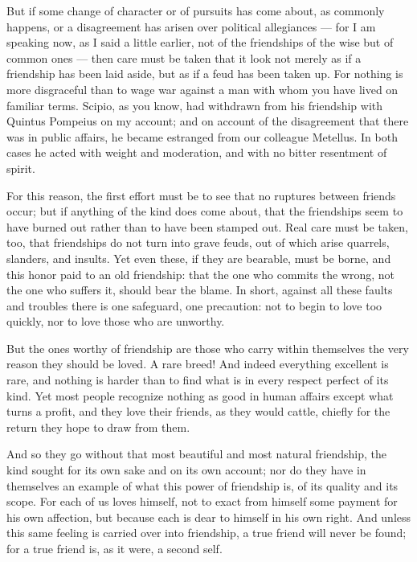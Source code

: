  But if some change of character or of pursuits has come about, as commonly happens, or a disagreement has arisen over political allegiances — for I am speaking now, as I said a little earlier, not of the friendships of the wise but of common ones — then care must be taken that it look not merely as if a friendship has been laid aside, but as if a feud has been taken up. For nothing is more disgraceful than to wage war against a man with whom you have lived on familiar terms. Scipio, as you know, had withdrawn from his friendship with Quintus Pompeius on my account; and on account of the disagreement that there was in public affairs, he became estranged from our colleague Metellus. In both cases he acted with weight and moderation, and with no bitter resentment of spirit.

 For this reason, the first effort must be to see that no ruptures between friends occur; but if anything of the kind does come about, that the friendships seem to have burned out rather than to have been stamped out. Real care must be taken, too, that friendships do not turn into grave feuds, out of which arise quarrels, slanders, and insults. Yet even these, if they are bearable, must be borne, and this honor paid to an old friendship: that the one who commits the wrong, not the one who suffers it, should bear the blame. In short, against all these faults and troubles there is one safeguard, one precaution: not to begin to love too quickly, nor to love those who are unworthy.

 But the ones worthy of friendship are those who carry within themselves the very reason they should be loved. A rare breed! And indeed everything excellent is rare, and nothing is harder than to find what is in every respect perfect of its kind. Yet most people recognize nothing as good in human affairs except what turns a profit, and they love their friends, as they would cattle, chiefly for the return they hope to draw from them.

 And so they go without that most beautiful and most natural friendship, the kind sought for its own sake and on its own account; nor do they have in themselves an example of what this power of friendship is, of its quality and its scope. For each of us loves himself, not to exact from himself some payment for his own affection, but because each is dear to himself in his own right. And unless this same feeling is carried over into friendship, a true friend will never be found; for a true friend is, as it were, a second self.

